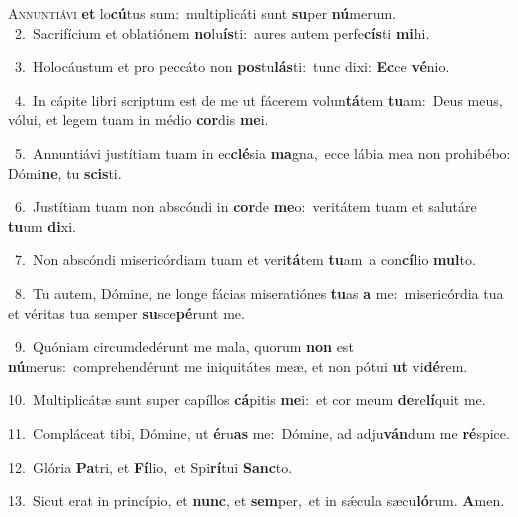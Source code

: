 \lettrine{\initial\textcolor{\initialcolor}{A}}{nnuntiávi} \textbf{et} lo\-\textbf{cú}\-tus sum:~\star multiplicáti sunt \textbf{su}\-per \textbf{nú}\-merum.\\
{\numbfont\textcolor{\numbcolor}{~2.}}~Sacrifícium et oblatiónem \textbf{no}\-lu\-\textbf{ís}\-ti:~\star aures autem perfe\-\textbf{cís}\-ti \textbf{mi}\-hi.\par
{\numbfont\textcolor{\numbcolor}{~3.}}~Holocáustum et pro peccáto non \textbf{pos}\-tu\-\textbf{lás}\-ti:~\star tunc dixi: \textbf{Ec}\-ce \textbf{vé}\-nio.\par
{\numbfont\textcolor{\numbcolor}{~4.}}~In cápite libri scriptum est de me ut fácerem volun\-\textbf{tá}\-tem \textbf{tu}\-am:~\star Deus meus, vólui, et legem tuam in médio \textbf{cor}\-dis \textbf{me}\-i.\par
{\numbfont\textcolor{\numbcolor}{~5.}}~Annuntiávi justítiam tuam in ec\-\textbf{clé}\-sia \textbf{ma}\-gna,~\star ecce lábia mea non prohibébo: Dómi\-\textbf{ne}\-, tu \textbf{scis}\-ti.\par
{\numbfont\textcolor{\numbcolor}{~6.}}~Justítiam tuam non abscóndi in \textbf{cor}\-de \textbf{me}\-o:~\star veritátem tuam et salutáre \textbf{tu}\-um \textbf{di}\-xi.\par
{\numbfont\textcolor{\numbcolor}{~7.}}~Non abscóndi misericórdiam tuam et veri\-\textbf{tá}\-tem \textbf{tu}\-am~\star a con\-\textbf{cí}\-lio \textbf{mul}\-to.\par
{\numbfont\textcolor{\numbcolor}{~8.}}~Tu autem, Dómine, ne longe fácias miseratiónes \textbf{tu}\-as \textbf{a} me:~\star misericórdia tua et véritas tua semper \textbf{su}\-sce\-\textbf{pé}\-runt me.\par
{\numbfont\textcolor{\numbcolor}{~9.}}~Quóniam circumdedérunt me mala, quorum \textbf{non} est \textbf{nú}\-merus:~\star comprehendérunt me iniquitátes meæ, et non pótui \textbf{ut} vi\-\textbf{dé}\-rem.\par
{\numbfont\textcolor{\numbcolor}{10.}}~Multiplicátæ sunt super capíllos \textbf{cá}\-pitis \textbf{me}\-i:~\star et cor meum \textbf{de}\-re\-\textbf{lí}\-quit me.\par
{\numbfont\textcolor{\numbcolor}{11.}}~Compláceat tibi, Dómine, ut \textbf{é}\-ru\textbf{as} me:~\star Dómine, ad adju\-\textbf{ván}\-dum me \textbf{ré}\-spice.\par
{\numbfont\textcolor{\numbcolor}{12.}}~Glória \textbf{Pa}\-tri, et \textbf{Fí}\-lio,~\star et Spi\-\textbf{rí}\-tui \textbf{Sanc}\-to.\par
{\numbfont\textcolor{\numbcolor}{13.}}~Sicut erat in princípio, et \textbf{nunc}\-, et \textbf{sem}\-per,~\star et in sǽcula sæcu\-\textbf{ló}\-rum. \textbf{A}\-men.\par
